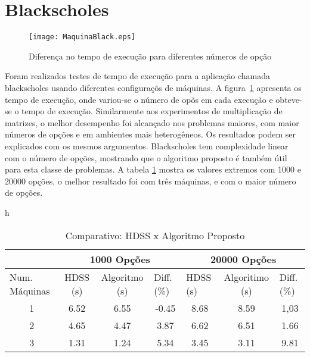 \section{Blackscholes}

\begin{figure}[htb]
	\begin{center}
	\centering
			\texttt{[image: MaquinaBlack.eps]}
	\caption{Diferença no tempo de execução para diferentes números de opção}
	\label{fig:black}
	\end{center}
\end{figure}

Foram realizados testes de tempo de execução para a aplicação chamada blackscholes usando diferentes configuraçõs de máquinas. A figura~\ref{fig:black} apresenta os tempo de execução, onde variou-se o número de opõs em cada execução e obteve-se o tempo de execução. Similarmente aos experimentos de multiplicação de matrizes, o melhor desempenho foi alcançado nos problemas maiores, com maior números de opções e em ambientes mais heterogêneos. Os resultados podem ser explicados com os mesmos argumentos. Blackscholes tem complexidade linear com o número de opções, mostrando que o algoritmo proposto é também útil para esta classe de problemas. A tabela  \ref{table: black} mostra os valores extremos com 1000 e 20000 opções, o melhor resultado foi com três máquinas, e com o maior número de opções.

\begin{table}{h}
\centering
\tiny
\caption{Comparativo: HDSS x Algoritmo Proposto}

\begin{tabular}{c|c|c|c|c|c|c|}
\cline{2-7}
\multicolumn{1}{l|}{}                 & \multicolumn{3}{c|}{1000 Opções}                              & \multicolumn{3}{c|}{20000 Opções}                                                  \\ \hline
\multicolumn{1}{|l|}{Num. Máquinas} & HDSS (s) & Algoritmo (s) & \multicolumn{1}{l|}{Diff. (\%)} & \multicolumn{1}{l|}{HDSS (s)} & Algoritimo (s) & \multicolumn{1}{l|}{Diff. (\%)} \\ \hline
\multicolumn{1}{|c|}{1 }       & 6.52     & 6.55              & -0.45                           & 8.68                          & 8.59              & 1,03                            \\ \hline
\multicolumn{1}{|c|}{2 }      & 4.65     & 4.47              & 3.87                            & 6.62                          & 6.51              & 1.66                            \\ \hline
\multicolumn{1}{|c|}{3 }      & 1.31     & 1.24              & 5.34                            & 3.45                          & 3.11              &               9.81                  \\ \hline
\end{tabular}
\label{table: black}
\end{table}

